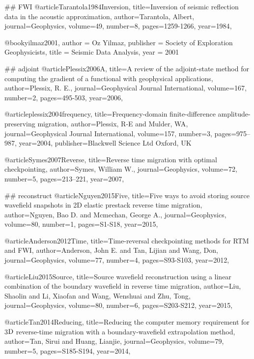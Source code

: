 ## FWI
@article{Tarantola1984Inversion,
  title={Inversion of seismic reflection data in the acoustic approximation},
  author={Tarantola, Albert},
  journal={Geophysics},
  volume={49},
  number={8},
  pages={1259-1266},
  year={1984},
}

@book{yilmaz2001,
   author = {Oz Yilmaz},
   publisher = {Society of Exploration Geophysicists},
   title = {Seismic Data Analysis},
   year = {2001}
}

## adjoint
@article{Plessix2006A,
  title={A review of the adjoint-state method for computing the gradient of a functional with geophysical applications},
  author={Plessix, R. E.},
  journal={Geophysical Journal International},
  volume={167},
  number={2},
  pages={495-503},
  year={2006},
}

@article{plessix2004frequency,
  title={Frequency-domain finite-difference amplitude-preserving migration},
  author={Plessix, R-E and Mulder, WA},
  journal={Geophysical Journal International},
  volume={157},
  number={3},
  pages={975--987},
  year={2004},
  publisher={Blackwell Science Ltd Oxford, UK}
}

@article{Symes2007Reverse,
  title={Reverse time migration with optimal checkpointing},
  author={Symes, William W.},
  journal={Geophysics},
  volume={72},
  number={5},
  pages={213--221},
  year={2007},
}


## reconstruct
@article{Nguyen2015Five,
  title={Five ways to avoid storing source wavefield snapshots in 2D elastic prestack reverse time migration},
  author={Nguyen, Bao D. and Mcmechan, George A.},
  journal={Geophysics},
  volume={80},
  number={1},
  pages={S1-S18},
  year={2015},
}

@article{Anderson2012Time,
  title={Time-reversal checkpointing methods for {RTM} and {FWI}},
  author={Anderson, John E. and Tan, Lijian and Wang, Don},
  journal={Geophysics},
  volume={77},
  number={4},
  pages={S93-S103},
  year={2012},
}

@article{Liu2015Source,
  title={Source wavefield reconstruction using a linear combination of the boundary wavefield in reverse time migration},
  author={Liu, Shaolin and Li, Xiaofan and Wang, Wenshuai and Zhu, Tong},
  journal={Geophysics},
  volume={80},
  number={6},
  pages={S203-S212},
  year={2015},
}

@article{Tan2014Reducing,
  title={Reducing the computer memory requirement for 3$\textnormal{D}$ reverse-time migration with a boundary-wavefield extrapolation method},
  author={Tan, Sirui and Huang, Lianjie},
  journal={Geophysics},
  volume={79},
  number={5},
  pages={S185-S194},
  year={2014},
}



